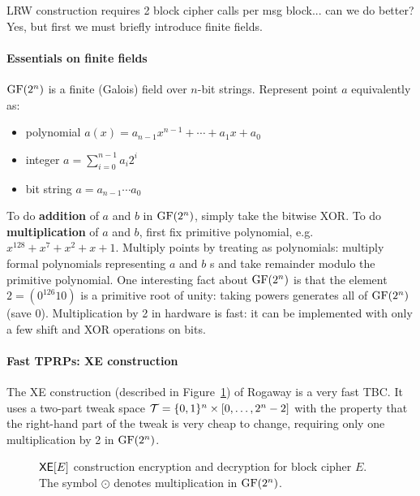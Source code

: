 LRW construction requires 2 block cipher calls per msg block... can we do better? Yes, but first we must briefly introduce finite fields.

\paragraph{Essentials on finite fields} $\text{GF}(2^{n})$ is a finite (Galois) field over $n$-bit strings. Represent point $a$ equivalently as:
\begin{itemize}
\item polynomial $a(x) = a_{n-1}x^{n-1} + \cdots + a_1 x + a_0$
\item integer $a = \sum\limits_{i=0}^{n-1} a_i 2^i$
\item bit string $a= a_{n-1}\cdots a_0$
\end{itemize}

To do \textbf{addition} of $a$ and $b$ in $\text{GF}(2^n)$, simply take the bitwise XOR. To do \textbf{multiplication} of $a$ and $b$, first fix primitive polynomial, e.g. $x^{128} + x^{7} + x^2 + x + 1$. Multiply points by treating as polynomials: multiply formal polynomials representing $a$ and $b$ s and take remainder modulo the primitive polynomial. One interesting fact about $\text{GF}(2^{n})$ is that the element $2=(0^{126}10)$ is a primitive root of unity: taking powers generates all of $\text{GF}(2^{n})$ (save 0). Multiplication by 2 in hardware is fast: it can be implemented with only a few shift and XOR operations on bits.



\paragraph{Fast TPRPs: XE construction} The XE construction (described in Figure~\ref{fig:xe}) of Rogaway is a very fast TBC. It uses a two-part tweak space $\mathcal{T} = \{0,1\}^{n}\times [0, \ldots, 2^{n}-2]$ with the property that the right-hand part of the tweak is very cheap to change, requiring only one multiplication by 2 in $\text{GF}(2^{n})$.

\begin{figure}[h]
  \centering
  \caption{$\mathsf{XE}[E]$ construction encryption and decryption for block cipher $E$. The symbol $\odot$ denotes multiplication in $\text{GF}(2^{n})$.}
  \label{fig:xe}
\end{figure}



